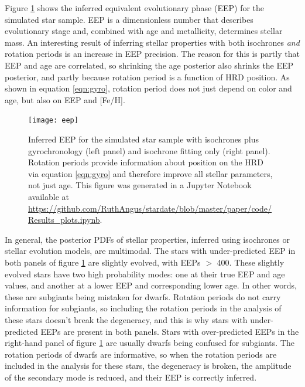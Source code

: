 Figure \ref{fig:eep} shows the inferred equivalent evolutionary phase (EEP)
for the simulated star sample.
EEP is a dimensionless number that describes evolutionary stage and, combined
with age and metallicity, determines stellar mass.
An interesting result of inferring stellar properties with both isochrones
{\it and} rotation periods is an increase in EEP precision.
The reason for this is partly that EEP and age are correlated, so shrinking
the age posterior also shrinks the EEP posterior, and partly because rotation
period is a function of HRD position.
As shown in equation \ref{eqn:gyro}, rotation period does not just depend on
color and age, but also on EEP and [Fe/H].
\begin{figure}
  \caption{
    Inferred EEP for the simulated star sample with isochrones plus
    gyrochronology (left panel) and isochrone fitting only (right panel).
    Rotation periods provide information about position on the HRD via
equation \ref{eqn:gyro} and therefore improve all stellar parameters, not
just age.
    This figure was generated in a Jupyter Notebook available at
    \url{https://github.com/RuthAngus/stardate/blob/master/paper/code/Results_plots.ipynb}.
}
  \centering
    \texttt{[image: eep]}
\label{fig:eep}
\end{figure}
In general, the posterior PDFs of stellar properties, inferred using
isochrones or stellar evolution models, are multimodal.
The stars with under-predicted EEP in both panels of figure \ref{fig:eep} are
slightly evolved, with EEPs $>$ 400.
These slightly evolved stars have two high probability modes: one at their
true EEP and age values, and another at a lower EEP and corresponding lower
age.
In other words, these are subgiants being mistaken for dwarfs.
Rotation periods do not carry information for subgiants, so including the
rotation periods in the analysis of these stars doesn't break the degeneracy,
and this is why stars with under-predicted EEPs are present in both panels.
Stars with over-predicted EEPs in the right-hand panel of figure \ref{fig:eep}
are usually dwarfs being confused for subgiants.
The rotation periods of dwarfs are informative, so when the rotation periods
are included in the analysis for these stars, the degeneracy is broken, the
amplitude of the secondary mode is reduced, and their EEP is correctly
inferred.

